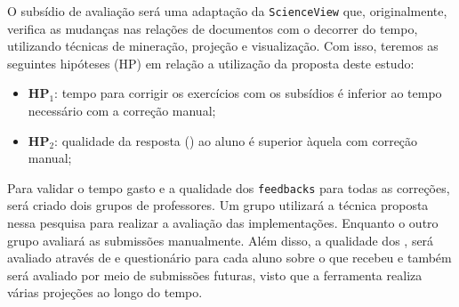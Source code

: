 	O subsídio de avaliação será uma adaptação da \texttt{ScienceView} \cite{Alencar-etal:2012}
	que, originalmente, verifica as mudanças nas relações de documentos com o decorrer do tempo,
	utilizando técnicas de mineração, projeção e visualização. Com isso, teremos as
	seguintes hipóteses (HP) em relação a utilização da proposta deste estudo:
	
	\begin{itemize}
		\item \textbf{HP$_1$}: tempo para corrigir os exercícios com os subsídios é inferior
		ao tempo necessário com a correção manual;
		\item \textbf{HP$_2$}: qualidade da resposta () ao aluno é superior
		àquela com correção manual;
	\end{itemize}
	
	Para validar o tempo gasto e a qualidade dos \texttt{feedbacks} para todas as correções,
	será criado dois grupos de professores. Um grupo utilizará a técnica proposta nessa pesquisa para
	realizar a avaliação das implementações. Enquanto o outro grupo avaliará as submissões
	manualmente. Além disso, a qualidade dos , será avaliado através de 
	e questionário para cada aluno sobre o  que recebeu e também será avaliado
	por meio de submissões futuras, visto que a ferramenta realiza várias projeções ao longo do tempo.

